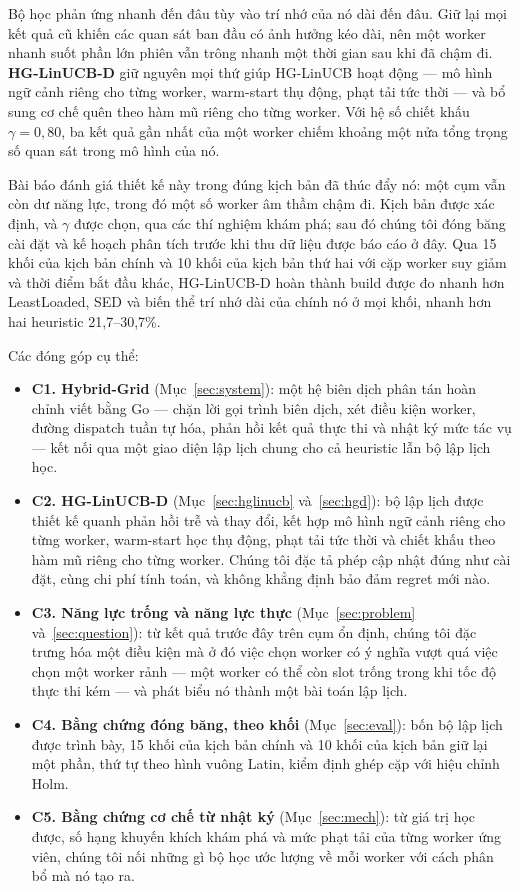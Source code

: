 \documentclass[final,5p,times,twocolumn]{elsarticle}
\begin{document}
Bộ học phản ứng nhanh đến đâu tùy vào trí nhớ của nó dài đến đâu. Giữ lại mọi kết quả cũ khiến các quan sát ban đầu có ảnh hưởng kéo dài, nên một worker nhanh suốt phần lớn phiên vẫn trông nhanh một thời gian sau khi đã chậm đi. \textbf{HG-LinUCB-D} giữ nguyên mọi thứ giúp HG-LinUCB hoạt động --- mô hình ngữ cảnh riêng cho từng worker, warm-start thụ động, phạt tải tức thời --- và bổ sung cơ chế quên theo hàm mũ riêng cho từng worker. Với hệ số chiết khấu $\gamma=0{,}80$, ba kết quả gần nhất của một worker chiếm khoảng một nửa tổng trọng số quan sát trong mô hình của nó.

Bài báo đánh giá thiết kế này trong đúng kịch bản đã thúc đẩy nó: một cụm vẫn còn dư năng lực, trong đó một số worker âm thầm chậm đi. Kịch bản được xác định, và $\gamma$ được chọn, qua các thí nghiệm khám phá; sau đó chúng tôi đóng băng cài đặt và kế hoạch phân tích trước khi thu dữ liệu được báo cáo ở đây. Qua 15 khối của kịch bản chính và 10 khối của kịch bản thứ hai với cặp worker suy giảm và thời điểm bắt đầu khác, HG-LinUCB-D hoàn thành build được đo nhanh hơn LeastLoaded, SED và biến thể trí nhớ dài của chính nó ở mọi khối, nhanh hơn hai heuristic 21,7--30,7\%.

Các đóng góp cụ thể:

\begin{itemize}
\item \textbf{C1. Hybrid-Grid} (Mục~\ref{sec:system}): một hệ biên dịch phân tán hoàn chỉnh viết bằng Go --- chặn lời gọi trình biên dịch, xét điều kiện worker, đường dispatch tuần tự hóa, phản hồi kết quả thực thi và nhật ký mức tác vụ --- kết nối qua một giao diện lập lịch chung cho cả heuristic lẫn bộ lập lịch học.
\item \textbf{C2. HG-LinUCB-D} (Mục~\ref{sec:hglinucb} và~\ref{sec:hgd}): bộ lập lịch được thiết kế quanh phản hồi trễ và thay đổi, kết hợp mô hình ngữ cảnh riêng cho từng worker, warm-start học thụ động, phạt tải tức thời và chiết khấu theo hàm mũ riêng cho từng worker. Chúng tôi đặc tả phép cập nhật đúng như cài đặt, cùng chi phí tính toán, và không khẳng định bảo đảm regret mới nào.
\item \textbf{C3. Năng lực trống và năng lực thực} (Mục~\ref{sec:problem} và~\ref{sec:question}): từ kết quả trước đây trên cụm ổn định, chúng tôi đặc trưng hóa một điều kiện mà ở đó việc chọn worker có ý nghĩa vượt quá việc chọn một worker rảnh --- một worker có thể còn slot trống trong khi tốc độ thực thi kém --- và phát biểu nó thành một bài toán lập lịch.
\item \textbf{C4. Bằng chứng đóng băng, theo khối} (Mục~\ref{sec:eval}): bốn bộ lập lịch được trình bày, 15 khối của kịch bản chính và 10 khối của kịch bản giữ lại một phần, thứ tự theo hình vuông Latin, kiểm định ghép cặp với hiệu chỉnh Holm.
\item \textbf{C5. Bằng chứng cơ chế từ nhật ký} (Mục~\ref{sec:mech}): từ giá trị học được, số hạng khuyến khích khám phá và mức phạt tải của từng worker ứng viên, chúng tôi nối những gì bộ học ước lượng về mỗi worker với cách phân bổ mà nó tạo ra.
\end{itemize}
\end{document}
